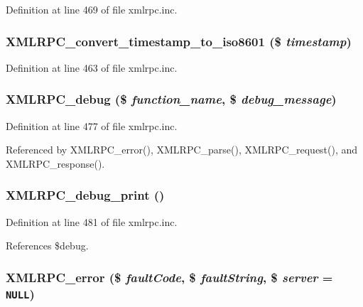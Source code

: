Definition at line 469 of file xmlrpc.inc.\hypertarget{xmlrpc_8inc_4485d809c5d598949d9cfaca42bddf37}{
\subsubsection{\setlength{\rightskip}{0pt plus 5cm}XMLRPC\_\-convert\_\-timestamp\_\-to\_\-iso8601 (\$ {\em timestamp})}}
\label{xmlrpc_8inc_4485d809c5d598949d9cfaca42bddf37}




Definition at line 463 of file xmlrpc.inc.\hypertarget{xmlrpc_8inc_e2d2e97a8c1c560f5e96d58d60a02874}{
\subsubsection{\setlength{\rightskip}{0pt plus 5cm}XMLRPC\_\-debug (\$ {\em function\_\-name}, \$ {\em debug\_\-message})}}
\label{xmlrpc_8inc_e2d2e97a8c1c560f5e96d58d60a02874}




Definition at line 477 of file xmlrpc.inc.

Referenced by XMLRPC\_\-error(), XMLRPC\_\-parse(), XMLRPC\_\-request(), and XMLRPC\_\-response().\hypertarget{xmlrpc_8inc_8467f85edd385ddf2506b1bd5065a6d7}{
\subsubsection{\setlength{\rightskip}{0pt plus 5cm}XMLRPC\_\-debug\_\-print ()}}
\label{xmlrpc_8inc_8467f85edd385ddf2506b1bd5065a6d7}




Definition at line 481 of file xmlrpc.inc.

References \$debug.\hypertarget{xmlrpc_8inc_0cdc54b1376ccbbe412175c9819a95ac}{
\subsubsection{\setlength{\rightskip}{0pt plus 5cm}XMLRPC\_\-error (\$ {\em faultCode}, \$ {\em faultString}, \$ {\em server} = {\tt NULL})}}
\label{xmlrpc_8inc_0cdc54b1376ccbbe412175c9819a95ac}




